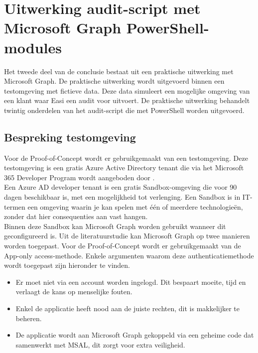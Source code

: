 
\chapter{Uitwerking audit-script met Microsoft Graph PowerShell-modules}%
\label{ch:poc}


Het tweede deel van de conclusie bestaat uit een praktische uitwerking met Microsoft Graph. De praktische uitwerking wordt uitgevoerd binnen een testomgeving met fictieve data. Deze data simuleert een mogelijke omgeving van een klant waar Easi een audit voor uitvoert. De praktische uitwerking behandelt twintig onderdelen van het audit-script die met PowerShell worden uitgevoerd.

\section{Bespreking testomgeving}


Voor de Proof-of-Concept wordt er gebruikgemaakt van een testomgeving. Deze testomgeving is een gratis Azure Active Directory tenant die via het Microsoft 365 Developer Program wordt aangeboden door \textcite{Microsoft2023q}. \\

Een Azure \ac{AD} developer tenant is een gratis Sandbox-omgeving die voor 90 dagen beschikbaar is, met een mogelijkheid tot verlenging. Een Sandbox is in \ac{IT}-termen een omgeving waarin je kan spelen met één of meerdere technologieën, zonder dat hier consequenties aan vast hangen. \\

Binnen deze Sandbox kan Microsoft Graph worden gebruikt wanneer dit geconfigureerd is. Uit de literatuurstudie kan Microsoft Graph op twee manieren worden toegepast. Voor de Proof-of-Concept wordt er gebruikgemaakt van de App-only access-methode. Enkele argumenten waarom deze authenticatiemethode wordt toegepast zijn hieronder te vinden. 

\begin{itemize}
    \item Er moet niet via een account worden ingelogd. Dit bespaart moeite, tijd en verlaagt de kans op menselijke fouten.
    \item Enkel de applicatie heeft nood aan de juiste rechten, dit is makkelijker te beheren.
    \item De applicatie wordt aan Microsoft Graph gekoppeld via een geheime code dat samenwerkt met \ac{MSAL}, dit zorgt voor extra veiligheid.
\end{itemize}

